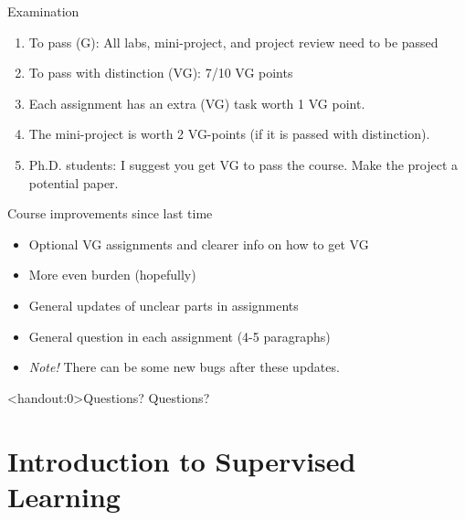 \documentclass[10pt,handout]{beamer}
\begin{document}
\begin{frame}{Examination}

\begin{enumerate}
\item To pass (G): All labs, mini-project, and project review need to be passed\pause
\item To pass with distinction (VG): 7/10 VG points\pause
\item Each assignment has an extra (VG) task worth 1 VG point.\pause
\item The mini-project is worth 2 VG-points (if it is passed with distinction).
\item Ph.D. students: I suggest you get VG to pass the course. Make the project a potential paper.
\end{enumerate}



\end{frame}


\begin{frame}{Course improvements since last time}

\begin{itemize}
\item Optional VG assignments and clearer info on how to get VG
\item More even burden (hopefully)
\item General updates of unclear parts in assignments
\item General question in each assignment (4-5 paragraphs)
\item \emph{Note!} There can be some new bugs after these updates.
\end{itemize}

\end{frame}

\begin{frame}<handout:0>{Questions?}
Questions?
\end{frame}


\section{Introduction to Supervised Learning}
\frame{\sectionpage}
\end{document}
